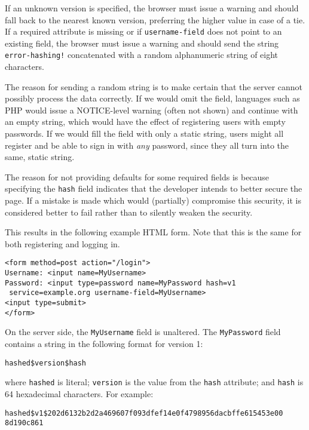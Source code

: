 \documentclass{paper}
\newcommand{\code}[1]{\texttt{\colorbox{gray!11}{#1}}}
\begin{document}
If an unknown version is specified, the browser must issue a warning and should fall back to
the nearest known version, preferring the higher value in case of a tie. If a required
attribute is missing or if \code{username-field} does not point to an existing field, the
browser must issue a warning and should send the string \code{error-hashing!} concatenated
with a random alphanumeric string of eight characters.

The reason for sending a random string is to make certain that the server cannot possibly
process the data correctly. If we would omit the field, languages such as PHP would issue a
NOTICE-level warning (often not shown) and continue with an empty string, which would have
the effect of registering users with empty passwords. If we would fill the field with only a
static string, users might all register and be able to sign in with {\it any} password, since
they all turn into the same, static string.

The reason for not providing defaults for some required fields is because specifying the
\code{hash} field indicates that the developer intends to better secure the page. If a
mistake is made which would (partially) compromise this security, it is considered better to
fail rather than to silently weaken the security.

This results in the following example HTML form. Note that this is the same for both
registering and logging in.

\code{<form method=post action="/login">} \\
\code{Username: <input name=MyUsername>} \\
\code{Password: <input type=password name=MyPassword hash=v1} \\
\code{ service=example.org username-field=MyUsername>} \\
\code{<input type=submit>} \\
\code{</form>}

On the server side, the \code{MyUsername} field is unaltered. The \code{MyPassword} field
contains a string in the following format for version 1:

\code{hashed\$version\$hash}

where \code{hashed} is literal; \code{version} is the value from the \code{hash} attribute;
and \code{hash} is 64 hexadecimal characters. For example:

\code{hashed\$v1\$202d6132b2d2a469607f093dfef14e0f4798956dacbffe615453e00} \\
\code{8d190c861}
\end{document}
